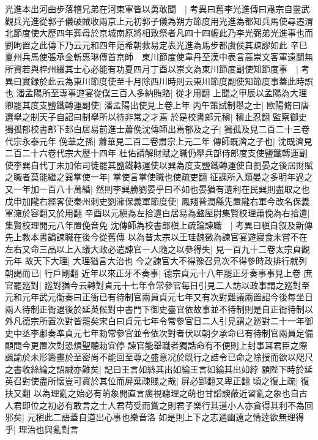 光進本出河曲步落稽兄弟在河東軍皆以勇敢聞　|{
	考異曰舊李光進傳曰肅宗自靈武觀兵光進從郭子儀破賊收兩京上元初郭子儀為朔方節度用光進為都知兵馬使尋遷渭北節度使大歷四年葬母於京城南原將相致祭者凡四十四幄此乃李光弼弟光進事也而劉昫置之此傳下乃云元和四年范希朝救易定表光進為馬步都虞侯其疎謬如此}
辛巳夏州兵馬使張承金斬惠琳傳首京師　東川節度使韋丹至漢中表言高崇文客軍遠鬬無所資若與梓州綴其士心必能有功夏四月丁酉以崇文為東川節度副使知節度事　|{
	考異曰實録於此云為東川節度使至十月除西川時則云東川節度副使知節度事蓋此時誤也}
潘孟陽所至專事遊宴從僕三百人多納賄賂|{
	從才用翻}
上聞之甲辰以孟陽為大理卿罷其度支鹽鐵轉運副使|{
	潘孟陽出使見上卷上年}
丙午策試制舉之士|{
	歐陽脩曰唐選舉之制天子自詔曰制舉所以待非常之才焉}
於是校書郎元稹|{
	稹止忍翻}
監察御史獨孤郁校書郎下邽白居易前進士蕭俛沈傳師出焉郁及之子|{
	獨孤及見二百二十三卷代宗永泰元年}
俛華之孫|{
	蕭華見二百二卷肅宗上元二年}
傳師既濟之子也|{
	沈既濟見二百二十六卷代宗大歷十四年}
杜佑請解財賦之職仍舉兵部侍郎度支使鹽鐵轉運副使李巽自代丁未加佑司徒罷其鹽鐵轉運使以巽為度支鹽鐵轉運使自劉晏之後居財賦之職者莫能繼之巽掌使一年|{
	掌使言掌使職也使疏吏翻}
征課所入類晏之多明年過之又一年加一百八十萬緍|{
	然則李巽勝劉晏乎曰不如也晏猶有遺利在民巽則盡取之也}
戊申加隴右經畧使秦州刺史劉澭保義軍節度使|{
	鳳翔普潤縣先置隴右軍今改名保義軍澭於容翻又於用翻}
辛酉以元稹為左拾遺白居易為盩厔尉集賢校理蕭俛為右拾遺|{
	集賢校理開元八年置俛音免}
沈傳師為校書郎稹上疏論諫職　|{
	考異曰稹自叙及新傳先上教本書論諫職在後今從舊傳}
以為昔太宗以王珪魏徵為諫官宴遊寢食未嘗不在左右又命三品以上入議大政必遣諫官一人隨之以參得失|{
	見一百九十二卷太宗貞觀元年}
故天下大理|{
	大理猶言大治也}
今之諫官大不得豫召見次不得參時政排行就列朝謁而已|{
	行戶剛翻}
近年以來正牙不奏事|{
	德宗貞元十八年罷正牙奏事事見上卷}
庶官罷廵對|{
	廵對猶今云轉對貞元十七年令常參官每日引見二人訪以政事謂之廵對至元和元年武元衡奏曰正衙已有待制官兩員貞元七年又有次對難議兩置詔今後每坐日兩人待制正衙退後於延英候對中書門下御史臺官依故事並不待制則是自正衙待制以外凡德宗所置次對皆罷矣宋白曰貞元七年令常參官日二人引見謂之廵對二十一年御史中丞李鄘奏凖貞元七年勅常參官並令依次對者伏以朝夕承命已有待制官兩員足備顧問今更置次對恐煩聖聽勅宜停}
諫官能舉職者獨誥命有不便則上封事耳君臣之際諷諭於未形籌畫於至密尚不能回至尊之盛意况於既行之誥令已命之除授而欲以咫尺之書收絲綸之詔誠亦難矣|{
	記曰王言如絲其出如綸王言如綸其出如綍}
願陛下時於延英召對使盡所懷豈可寘於其位而屏棄疎賤之哉|{
	屏必郢翻又卑正翻}
頃之復上疏|{
	復扶又翻}
以為理亂之始必有萌象開直言廣視聽理之萌也甘謟諛蔽近習亂之象也自古人君即位之初必有敢言之士人君苟受而賞之則君子樂行其道小人亦貪得其利不為回邪矣|{
	元稹此二語蓋自道出心事也樂音洛}
如是則上下之志通幽遠之情逹欲無理得乎|{
	理治也與亂對言}
